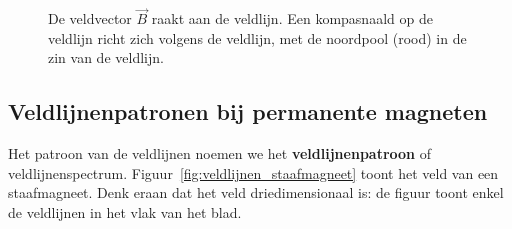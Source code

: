 \documentclass{ximera}
\begin{document}
\begin{figure}[ht!]
    \captionsetup{width=0.85\textwidth}
    \begin{center}
    \end{center}
    \caption{De veldvector $\vec{B}$ raakt aan de veldlijn. Een kompasnaald op de veldlijn richt zich volgens de veldlijn, met de noordpool (rood) in de zin van de veldlijn.}
    \label{fig:B_raaklijn}
\end{figure}

\subsection{Veldlijnenpatronen bij permanente magneten}
Het patroon van de veldlijnen noemen we het \textbf{veldlijnenpatroon} of veldlijnenspectrum. Figuur~\ref{fig:veldlijnen_staafmagneet} toont het veld van een staafmagneet. Denk eraan dat het veld driedimensionaal is: de figuur toont enkel de veldlijnen in het vlak van het blad.
\end{document}

